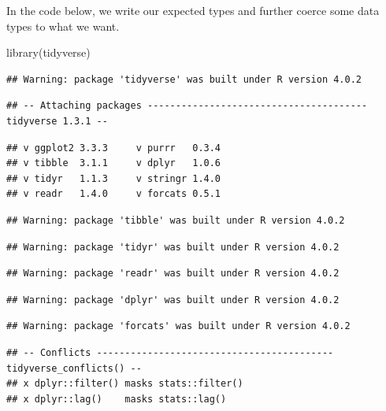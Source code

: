 \documentclass[
]{book}
\newenvironment{Shaded}{\begin{snugshade}}{\end{snugshade}}
\newcommand{\FunctionTok}[1]{\textcolor[rgb]{0.00,0.00,0.00}{#1}}
\newcommand{\NormalTok}[1]{#1}
\begin{document}
In the code below, we write our expected types and further coerce some data types to what we want.

\begin{Shaded}
\begin{Highlighting}[]
\FunctionTok{library}\NormalTok{(tidyverse)}
\end{Highlighting}
\end{Shaded}

\begin{verbatim}
## Warning: package 'tidyverse' was built under R version 4.0.2
\end{verbatim}

\begin{verbatim}
## -- Attaching packages --------------------------------------- tidyverse 1.3.1 --
\end{verbatim}

\begin{verbatim}
## v ggplot2 3.3.3     v purrr   0.3.4
## v tibble  3.1.1     v dplyr   1.0.6
## v tidyr   1.1.3     v stringr 1.4.0
## v readr   1.4.0     v forcats 0.5.1
\end{verbatim}

\begin{verbatim}
## Warning: package 'tibble' was built under R version 4.0.2
\end{verbatim}

\begin{verbatim}
## Warning: package 'tidyr' was built under R version 4.0.2
\end{verbatim}

\begin{verbatim}
## Warning: package 'readr' was built under R version 4.0.2
\end{verbatim}

\begin{verbatim}
## Warning: package 'dplyr' was built under R version 4.0.2
\end{verbatim}

\begin{verbatim}
## Warning: package 'forcats' was built under R version 4.0.2
\end{verbatim}

\begin{verbatim}
## -- Conflicts ------------------------------------------ tidyverse_conflicts() --
## x dplyr::filter() masks stats::filter()
## x dplyr::lag()    masks stats::lag()
\end{verbatim}
\end{document}

